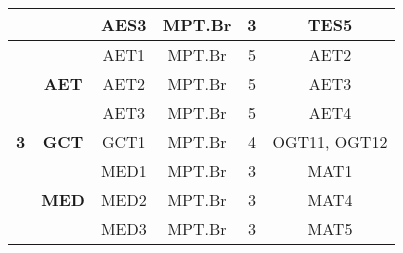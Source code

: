 \begin{table}[!ht]
{\begin{tabular}{|c|c|c|c|c|c|}
                                                                                &                               & AES3        & MPT.Br            & 3                                                                                  & TES5                                                                      \\ \hline
\multirow{7}{*}{\textbf{3}}                                                     & \multirow{3}{*}{\textbf{AET}} & AET1        & MPT.Br            & 5                                                                                  & AET2                                                                      \\ \cline{3-6} 
                                                                                &                               & AET2        & MPT.Br            & 5                                                                                  & AET3                                                                      \\ \cline{3-6} 
                                                                                &                               & AET3        & MPT.Br            & 5                                                                                  & AET4                                                                      \\ \cline{2-6} 
                                                                                & \textbf{GCT}                  & GCT1        & MPT.Br            & 4                                                                                  & OGT11, OGT12                                                              \\ \cline{2-6} 
                                                                                & \multirow{3}{*}{\textbf{MED}} & MED1        & MPT.Br            & 3                                                                                  & MAT1                                                                      \\ \cline{3-6} 
                                                                                &                               & MED2        & MPT.Br            & 3                                                                                  & MAT4                                                                      \\ \cline{3-6} 
                                                                                &                               & MED3        & MPT.Br            & 3                                                                                  & MAT5                                                                      \\ \hline

\end{tabular}}
\end{table}
